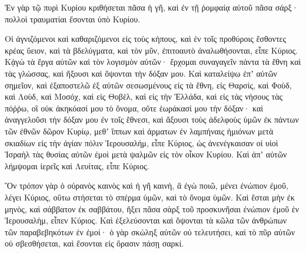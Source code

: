 {Ἐν γὰρ τῷ πυρὶ Κυρίου κριθήσεται πᾶσα ἡ γῆ, καὶ ἐν τῇ ῥομφαίᾳ αὐτοῦ πᾶσα σάρξ· πολλοὶ τραυματίαι ἔσονται ὑπὸ Κυρίου.
\par }{\PP {}Οἱ ἁγνιζόμενοι καὶ καθαριζόμενοι εἰς τοὺς κήπους, καὶ ἐν τοῖς προθύροις ἔσθοντες κρέας ὕειον, καὶ τὰ βδελύγματα, καὶ τὸν μῦν, ἐπιτοαυτὸ ἀναλωθήσονται, εἶπε Κύριος.
Κᾀγὼ τὰ ἔργα αὐτῶν καὶ τὸν λογισμὸν αὐτῶν· ἔρχομαι συναγαγεῖν πάντα τὰ ἔθνη καὶ τὰς γλώσσας, καὶ ἥξουσι καὶ ὄψονται τὴν δόξαν μου.
Καὶ καταλείψω ἐπʼ αὐτῶν σημεῖον, καὶ ἐξαποστελῶ ἐξ αὐτῶν σεσωσμένους εἰς τὰ ἔθνη, εἰς Θαρσὶς, καὶ Φοὺδ, καὶ Λοὺδ, καὶ Μοσόχ, καὶ εἰς Θοβὲλ, καὶ εἰς τὴν Ἑλλάδα, καὶ εἰς τὰς νήσους τὰς πόῤῥω, οἳ οὐκ ἀκηκόασί μου τὸ ὄνομα, οὔτε ἑωράκασί μου τὴν δόξαν· καὶ ἀναγγελοῦσι τὴν δόξαν μου ἐν τοῖς ἔθνεσι,
καὶ ἄξουσι τοὺς ἀδελφοὺς ὑμῶν ἐκ πάντων τῶν ἐθνῶν δῶρον Κυρίῳ, μεθʼ ἵππων καὶ ἁρματων ἐν λαμπήναις ἡμιόνων μετὰ σκιαδίων εἰς τὴν ἁγίαν πόλιν Ἱερουσαλήμ, εἶπε Κύριος, ὡς ἀνενέγκαισαν οἱ υἱοὶ Ἰσραὴλ τὰς θυσίας αὐτῶν ἐμοὶ μετὰ ψαλμῶν εἰς τὸν οἶκον Κυρίου.
Καὶ ἀπʼ αὐτῶν λήμψομαι ἱερεῖς καὶ Λευίτας, εἶπε Κύριος.
\par }{\PP {}Ὃν τρόπον γὰρ ὁ οὐρανὸς καινὸς καὶ ἡ γῆ καινὴ, ἃ ἐγὼ ποιῶ, μένει ἐνώπιον ἐμοῦ, λέγει Κύριος, οὕτω στήσεται τὸ σπέρμα ὑμῶν, καὶ τὸ ὄνομα ὑμῶν.
Καὶ ἔσται μὴν ἐκ μηνὸς, καὶ σάββατον ἐκ σαββάτου, ἥξει πᾶσα σὰρξ τοῦ προσκυνῆσαι ἐνώπιον ἐμοῦ ἐν Ἱερουσαλὴμ, εἶπεν Κύριος.
Καὶ ἐξελεύσονται καὶ ὄψονται τὰ κῶλα τῶν ἀνθρώπων τῶν παραβεβηκότων ἐν ἐμοί· ὁ γὰρ σκώληξ αὐτῶν οὐ τελευτήσει, καὶ τὸ πῦρ αὐτῶν οὐ σβεσθήσεται, καὶ ἔσονται εἰς ὅρασιν πάσῃ σαρκί.
\par }